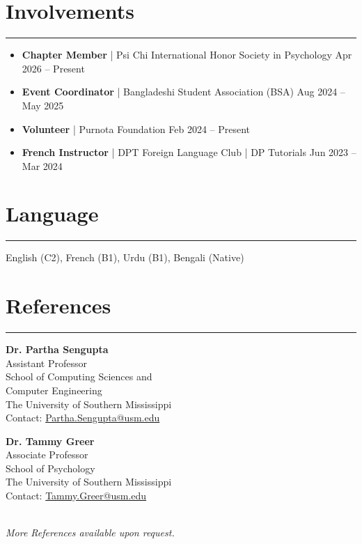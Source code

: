 \documentclass[10pt, a4paper]{article}
\begin{document}
\section*{Involvements}\vspace{-2pt}\hrule\vspace{6pt}
\begin{itemize}
    \item \textbf{Chapter Member} | Psi Chi International Honor Society in Psychology \hfill Apr 2026 -- Present
    \item \textbf{Event Coordinator} | Bangladeshi Student Association (BSA) \hfill Aug 2024 -- May 2025
    \item \textbf{Volunteer} | Purnota Foundation \hfill Feb 2024 -- Present
    \item \textbf{French Instructor} | DPT Foreign Language Club | DP Tutorials \hfill Jun 2023 -- Mar 2024
\end{itemize}

\section*{Language}\vspace{-2pt}\hrule\vspace{6pt}
English (C2), French (B1), Urdu (B1), Bengali (Native)

\section*{References}\vspace{-2pt}\hrule\vspace{6pt}

\noindent
\begin{minipage}[t]{0.45\textwidth}
    \textbf{Dr. Partha Sengupta} \\
    Assistant Professor \\
    School of Computing Sciences and \\
    Computer Engineering \\
    The University of Southern Mississippi \\
    Contact: \href{mailto:Partha.Sengupta@usm.edu}{Partha.Sengupta@usm.edu}
\end{minipage}
\hfill
\begin{minipage}[t]{0.45\textwidth}
    \textbf{Dr. Tammy Greer} \\
    Associate Professor \\
    School of Psychology \\
    The University of Southern Mississippi \\
    Contact: \href{mailto:Tammy.Greer@usm.edu}{Tammy.Greer@usm.edu}
\end{minipage} \\

\noindent\textit{More References available upon request.}
\end{document}
